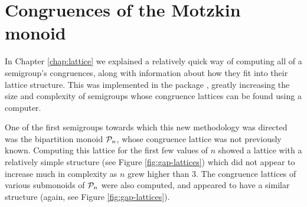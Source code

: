 \chapter{Congruences of the Motzkin monoid}
\label{chap:motzkin}

In Chapter \ref{chap:lattice} we explained a relatively quick way of computing
all of a semigroup's congruences, along with information about how they fit into
their lattice structure.  This was implemented in the \Semigroups{} package
\cite{semigroups}, greatly increasing the size and complexity of semigroups
whose congruence lattices can be found using a computer.

One of the first semigroups towards which this new methodology was directed was
the bipartition monoid $\mathcal{P}_n$, whose congruence lattice was not previously
known.  Computing this lattice for the first few values of $n$ showed a lattice
with a relatively simple structure (see Figure
\ref{fig:gap-lattices}) which did not appear to increase much in complexity as
$n$ grew higher than $3$.  The congruence lattices of various submonoids of
$\mathcal{P}_n$ were also computed, and appeared to have a similar structure (again,
see Figure \ref{fig:gap-lattices}).

